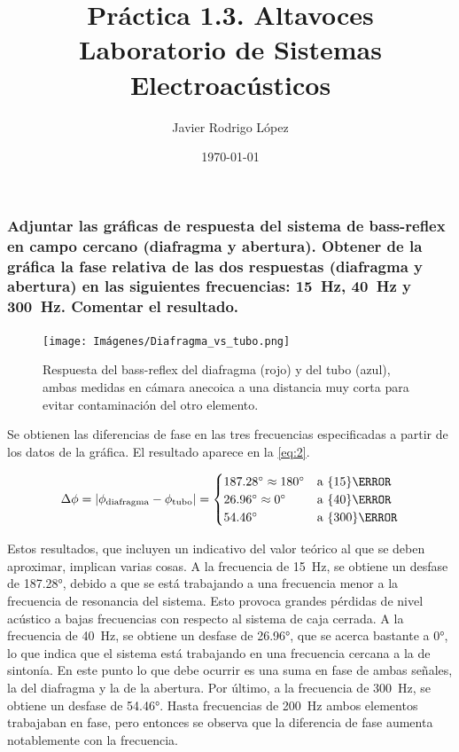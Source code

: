 \documentclass[10pt]{article}
\title{\Huge Práctica 1.3. Altavoces \\\huge Laboratorio de Sistemas Electroacústicos}
\author{Javier Rodrigo López}
\date{\today}
\begin{document}
\maketitle
\setcounter{subsubsection}{8}

\subsubsection{Adjuntar las gráficas de respuesta del sistema de bass-reflex en campo cercano (diafragma y abertura). Obtener de la gráfica la fase relativa de las dos respuestas (diafragma y abertura) en las siguientes frecuencias: \qty{15}{\hertz }, \qty{40}{\hertz } y \qty{300}{\hertz }. Comentar el resultado.}

\begin{figure}[hbtp]
  \centering
  \texttt{[image: Imágenes/Diafragma\_vs\_tubo.png]}
  \caption{Respuesta del bass-reflex del diafragma (rojo) y del tubo (azul), ambas medidas en cámara anecoica a una distancia muy corta para evitar contaminación del otro elemento.}
  \label{fig:Diafragma_vs_tubo.png}
\end{figure}

Se obtienen las diferencias de fase en las tres frecuencias especificadas a partir de los datos de la gráfica. El resultado aparece en la \autoref{eq:2}.

\begin{equation} \label{eq:2}
  \Delta \phi = \abs{\phi_{\text{diafragma}} - \phi_{\text{tubo}}} = \begin{cases}
    \ang{187,28} \approx \ang{180} & \text{a }\qty{15}{\hertz }  \\
    \ang{26,96}  \approx \ang{0}   & \text{a }\qty{40}{\hertz }  \\
    \ang{54.46}                    & \text{a }\qty{300}{\hertz }
  \end{cases}
\end{equation}

Estos resultados, que incluyen un indicativo del valor teórico al que se deben aproximar, implican varias cosas. A la frecuencia de \qty{15}{\hertz }, se obtiene un desfase de \ang{187.28}, debido a que se está trabajando a una frecuencia menor a la frecuencia de resonancia del sistema. Esto provoca grandes pérdidas de nivel acústico a bajas frecuencias con respecto al sistema de caja cerrada. A la frecuencia de \qty{40}{\hertz }, se obtiene un desfase de \ang{26.96}, que se acerca bastante a \ang{0}, lo que indica que el sistema está trabajando en una frecuencia cercana a la de sintonía. En este punto lo que debe ocurrir es una suma en fase de ambas señales, la del diafragma y la de la abertura. Por último, a la frecuencia de \qty{300}{\hertz }, se obtiene un desfase de \ang{54.46}. Hasta frecuencias de \qty{200}{\hertz } ambos elementos trabajaban en fase, pero entonces se observa que la diferencia de fase aumenta notablemente con la frecuencia.
\end{document}
